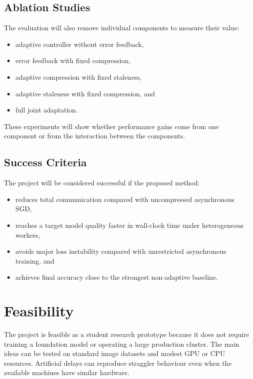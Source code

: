 \documentclass[conference]{IEEEtran}
\begin{document}
\subsection{Ablation Studies}

The evaluation will also remove individual components to measure their value:
\begin{itemize}
    \item adaptive controller without error feedback,
    \item error feedback with fixed compression,
    \item adaptive compression with fixed staleness,
    \item adaptive staleness with fixed compression, and
    \item full joint adaptation.
\end{itemize}

These experiments will show whether performance gains come from one component or from the interaction between the components.

\subsection{Success Criteria}

The project will be considered successful if the proposed method:
\begin{itemize}
    \item reduces total communication compared with uncompressed asynchronous SGD,
    \item reaches a target model quality faster in wall-clock time under heterogeneous workers,
    \item avoids major loss instability compared with unrestricted asynchronous training, and
    \item achieves final accuracy close to the strongest non-adaptive baseline.
\end{itemize}

\section{Feasibility}

The project is feasible as a student research prototype because it does not require training a foundation model or operating a large production cluster. The main ideas can be tested on standard image datasets and modest GPU or CPU resources. Artificial delays can reproduce straggler behaviour even when the available machines have similar hardware.
\end{document}
